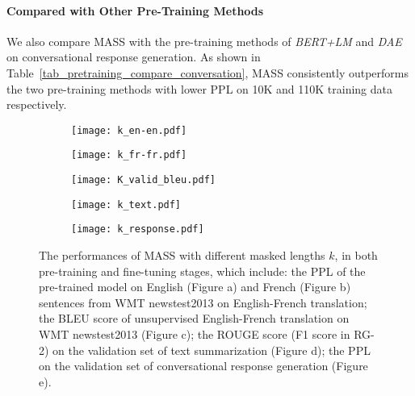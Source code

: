 \documentclass{article}
\begin{document}
	\paragraph{Compared with Other Pre-Training Methods}
	We also compare MASS with the pre-training methods of \textit{BERT+LM} and \textit{DAE} on conversational response generation. As shown in Table~\ref{tab_pretraining_compare_conversation}, MASS consistently outperforms the two pre-training methods with lower PPL on 10K and 110K training data respectively.
	
	\begin{figure*}[!t] 
		\small
		\centering
		
		\begin{subfigure}[h]{0.18\textwidth}
			\centering
			\texttt{[image: k\_en-en.pdf]}
			\vspace{-0.4cm}
			\caption{}
			\label{fig_k_enen_ppl}
		\end{subfigure}
		\begin{subfigure}[h]{0.18\textwidth}
			\centering
			\texttt{[image: k\_fr-fr.pdf]}
			\vspace{-0.4cm}
			\caption{}
			\label{fig_k_frfr_ppl}
		\end{subfigure}
		\begin{subfigure}[h]{0.18\textwidth}
			\centering
			\texttt{[image: K\_valid\_bleu.pdf]}
			\vspace{-0.4cm}
			\caption{}
			\label{fig_k_enfr_bleu}
		\end{subfigure}
		\begin{subfigure}[h]{0.18\textwidth}
			\centering
			\texttt{[image: k\_text.pdf]}
			\vspace{-0.4cm}
			\caption{}
			\label{fig_k_summarization}
		\end{subfigure}
		\begin{subfigure}[h]{0.18\textwidth}
			\centering
			\texttt{[image: k\_response.pdf]}
			\vspace{-0.4cm}
			\caption{}
			\label{fig_k_response}
		\end{subfigure}
		\vspace{-0.2cm}
		\caption{\small The performances of MASS with different masked lengths $k$, in both pre-training and fine-tuning stages, which include: the PPL of the pre-trained model on English (Figure a) and French (Figure b) sentences from WMT newstest2013 on English-French translation; the BLEU score of unsupervised English-French translation on WMT newstest2013 (Figure c); the ROUGE score (F1 score in RG-2) on the validation set of text summarization (Figure d); the PPL on the validation set of conversational response generation (Figure e).}
		\label{fig_mask_ratio}
	\end{figure*}
	
\end{document}
